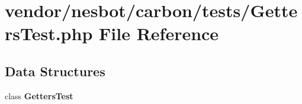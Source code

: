 \section{vendor/nesbot/carbon/tests/\+Getters\+Test.php File Reference}
\label{_getters_test_8php}
\subsection*{Data Structures}
\begin{DoxyCompactItemize}
\item 
class {\bf Getters\+Test}
\end{DoxyCompactItemize}
